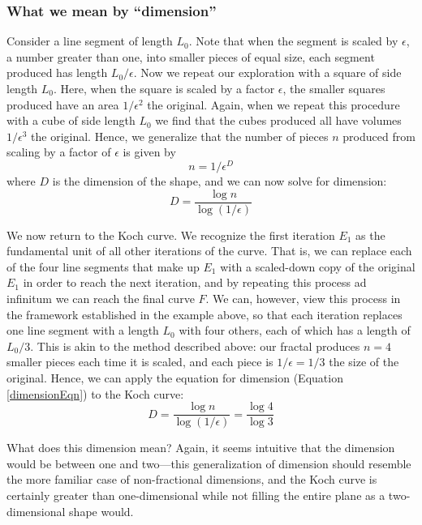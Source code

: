 \subsubsection{What we mean by ``dimension''}\label{intuitivedimension}
Consider a line segment of length $ L_0 $. Note that when the segment is scaled by $\epsilon$, a number greater than one, into smaller pieces of equal size, each segment produced has length $L_0/\epsilon$. Now we repeat our exploration with a square of side length $ L_0 $. Here, when the square is scaled by a factor $\epsilon$, the smaller squares produced have an area $1/\epsilon^2$ the original. Again, when we repeat this procedure with a cube of side length $ L_0 $ we find that the cubes produced all have volumes $1/\epsilon^3$ the original. Hence, we generalize that the number of pieces $n$ produced from scaling by a factor of $\epsilon$ is given by 
\begin{equation}n = 1/\epsilon^D\end{equation}
where $D$ is the dimension of the shape, and we can now solve for dimension:
\begin{equation}\label{dimensionEqn} D = \frac{\log{n}}{\log{(1/\epsilon)}}\end{equation}

We now return to the Koch curve. We recognize the first iteration $E_1$ as the fundamental unit of all other iterations of the curve. That is, we can replace each of the four line segments that make up $E_1$ with a scaled-down copy of the original $E_1$ in order to reach the next iteration, and by repeating this process ad infinitum we can reach the final curve $F$. We can, however, view this process in the framework established in the example above, so that each iteration replaces one line segment with a length $L_0$ with four others, each of which has a length of $L_0/3$. This is akin to the method described above: our fractal produces $n = 4$ smaller pieces each time it is scaled, and each piece is $1/\epsilon = 1/3$ the size of the original. Hence, we can apply the equation for dimension (Equation \ref{dimensionEqn}) to the Koch curve:
\begin{equation}D = \frac{\log{n}}{\log{(1/\epsilon)}} = \frac{\log{4}}{\log{3}} \end{equation}

\begin{myremark}What does this dimension mean? Again, it seems intuitive that the dimension would be between one and two---this generalization of dimension should resemble the more familiar case of non-fractional dimensions, and the Koch curve is certainly greater than one-dimensional while not filling the entire plane as a two-dimensional shape would. \end{myremark}

